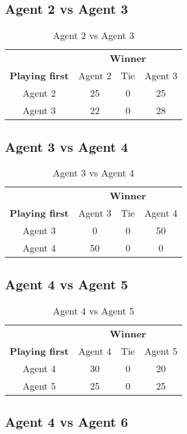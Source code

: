 \subsection{Agent 2 vs Agent 3}

\begin{table}[!h]
	\centering
	\label{result:Ag2vsAg3}
	\begin{tabular}{c | c | c | c}
		& \multicolumn{3}{c}{\textbf{Winner}}        \\
		\textbf{Playing first} & Agent 2 & Tie & Agent 3 \\ \hline
		Agent 2 & 25 & 0 & 25 \\ \hline
		Agent 3 & 22 & 0 & 28
	\end{tabular}
	\caption{Agent 2 vs Agent 3}
\end{table}

\subsection{Agent 3 vs Agent 4}

\begin{table}[!h]
	\centering
	\label{result:Ag3vsAg4}
	\begin{tabular}{c | c | c | c}
		& \multicolumn{3}{c}{\textbf{Winner}}        \\
		\textbf{Playing first} & Agent 3 & Tie & Agent 4 \\ \hline
		Agent 3 & 0 & 0 & 50 \\ \hline
		Agent 4 & 50 & 0 & 0
	\end{tabular}
	\caption{Agent 3 vs Agent 4}
\end{table}

\subsection{Agent 4 vs Agent 5}

\begin{table}[!h]
	\centering
	\label{result:Ag4vsAg5}
	\begin{tabular}{c | c | c | c}
		& \multicolumn{3}{c}{\textbf{Winner}}        \\
		\textbf{Playing first} & Agent 4 & Tie & Agent 5 \\ \hline
		Agent 4 & 30 & 0 & 20 \\ \hline
		Agent 5 & 25 & 0 & 25
	\end{tabular}
	\caption{Agent 4 vs Agent 5}
\end{table}

\subsection{Agent 4 vs Agent 6}

